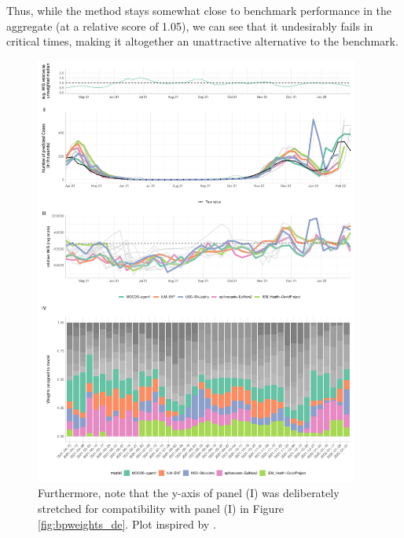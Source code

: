 Thus, while the method stays somewhat close to benchmark performance in the aggregate (at a relative score of 1.05), we can see that it undesirably fails in critical times, making it altogether an unattractive alternative to the benchmark.\medskip\\
\begin{figure}
\centering
\includegraphics[width = 0.95\textwidth]{../plots/best_performers_weights_pl}
\caption{Furthermore, note that the y-axis of panel (I) was deliberately stretched for compatibility with panel (I) in Figure \ref{fig:bpweights_de}. Plot inspired by \cite{ray_comparing_2022}.}
\label{fig:bpweights_pl}
\end{figure}
